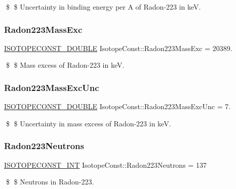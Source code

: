 \$ \$ Uncertainty in binding energy per A of Radon-\/223 in keV. \mbox{\label{group___isotope_const-_radon-_rn223_ga9ed08023a99093787cd580fce73f21cb}} 
\subsubsection{\texorpdfstring{Radon223\+Mass\+Exc}{Radon223MassExc}}
{\footnotesize\ttfamily \mbox{\hyperlink{group___isotope_const-_macros_ga8f45a7272ce02c0b4c65c44636ed719a}{I\+S\+O\+T\+O\+P\+E\+C\+O\+N\+S\+T\+\_\+\+D\+O\+U\+B\+LE}} Isotope\+Const\+::\+Radon223\+Mass\+Exc = 20389.}

\$ \$ Mass excess of Radon-\/223 in keV. \mbox{\label{group___isotope_const-_radon-_rn223_gae968af2c8d4f4b62b752165944383317}} 
\subsubsection{\texorpdfstring{Radon223\+Mass\+Exc\+Unc}{Radon223MassExcUnc}}
{\footnotesize\ttfamily \mbox{\hyperlink{group___isotope_const-_macros_ga8f45a7272ce02c0b4c65c44636ed719a}{I\+S\+O\+T\+O\+P\+E\+C\+O\+N\+S\+T\+\_\+\+D\+O\+U\+B\+LE}} Isotope\+Const\+::\+Radon223\+Mass\+Exc\+Unc = 7.}

\$ \$ Uncertainty in mass excess of Radon-\/223 in keV. \mbox{\label{group___isotope_const-_radon-_rn223_ga38024e8d25bcced1eea179b8723093af}} 
\subsubsection{\texorpdfstring{Radon223\+Neutrons}{Radon223Neutrons}}
{\footnotesize\ttfamily \mbox{\hyperlink{group___isotope_const-_macros_ga5f18360b3e99483a35c32d789e62621c}{I\+S\+O\+T\+O\+P\+E\+C\+O\+N\+S\+T\+\_\+\+I\+NT}} Isotope\+Const\+::\+Radon223\+Neutrons = 137}

\$ \$ Neutrons in Radon-\/223. \mbox{\label{group___isotope_const-_radon-_rn223_ga7d65bdf4463aaf5c19f1cb7bdcf5196e}} 
